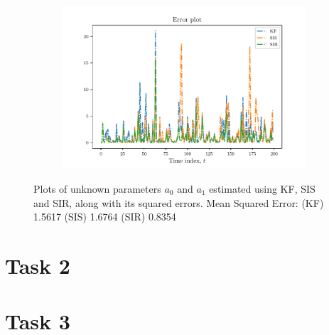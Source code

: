 \documentclass{article}
\begin{document}
\begin{figure}
    \centering
    \begin{subfigure}{.7\textwidth}
        \includegraphics[width=\textwidth]{Figures/error.pdf}
    \end{subfigure}
    \caption{Plots of unknown parameters $a_0$ and $a_1$ estimated using KF, SIS and SIR, along with its squared errors. Mean Squared Error: (KF) 1.5617 (SIS) 1.6764 (SIR) 0.8354}
    \label{fig:results-1}
\end{figure}


\section{Task 2}

\section{Task 3}

\printbibliography
\end{document}
